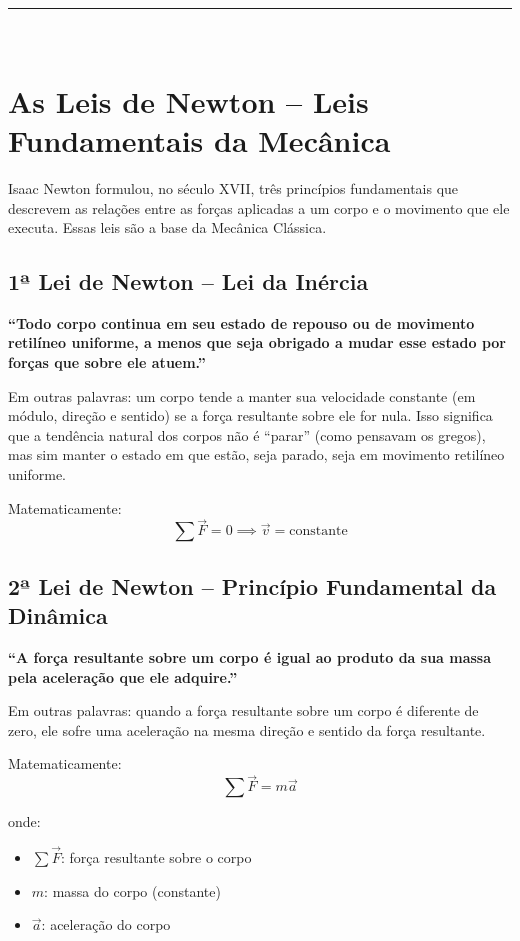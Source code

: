 \documentclass[a4paper,12pt]{article}
\begin{document}
\noindent\rule{\linewidth}{0.6pt}\\

\section*{As Leis de Newton – Leis Fundamentais da Mecânica}

Isaac Newton formulou, no século XVII, três princípios fundamentais que descrevem as relações entre as forças aplicadas a um corpo e o movimento que ele executa. Essas leis são a base da Mecânica Clássica.

\subsection*{1ª Lei de Newton – Lei da Inércia}

\textbf{``Todo corpo continua em seu estado de repouso ou de movimento retilíneo uniforme, a menos que seja obrigado a mudar esse estado por forças que sobre ele atuem.''}

Em outras palavras: um corpo tende a manter sua velocidade constante (em módulo, direção e sentido) se a força resultante sobre ele for nula. Isso significa que a tendência natural dos corpos não é ``parar'' (como pensavam os gregos), mas sim manter o estado em que estão, seja parado, seja em movimento retilíneo uniforme.

Matematicamente:
\[
\sum \vec{F} = 0 \implies \vec{v} = \text{constante}
\]

\subsection*{2ª Lei de Newton – Princípio Fundamental da Dinâmica}

\textbf{``A força resultante sobre um corpo é igual ao produto da sua massa pela aceleração que ele adquire.''}

Em outras palavras: quando a força resultante sobre um corpo é diferente de zero, ele sofre uma aceleração na mesma direção e sentido da força resultante.

Matematicamente:
\[
\sum \vec{F} = m \vec{a}
\]

onde:
\begin{itemize}
    \item \( \sum \vec{F} \): força resultante sobre o corpo
    \item \( m \): massa do corpo (constante)
    \item \( \vec{a} \): aceleração do corpo
\end{itemize}
\end{document}
